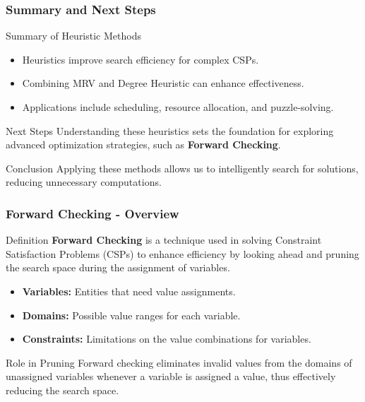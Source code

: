 \documentclass[aspectratio=169]{beamer}
\begin{document}
\begin{frame}[fragile]
    \frametitle{Summary and Next Steps}
    \begin{block}{Summary of Heuristic Methods}
        \begin{itemize}
            \item Heuristics improve search efficiency for complex CSPs.
            \item Combining MRV and Degree Heuristic can enhance effectiveness.
            \item Applications include scheduling, resource allocation, and puzzle-solving.
        \end{itemize}
    \end{block}
    
    \begin{block}{Next Steps}
        Understanding these heuristics sets the foundation for exploring advanced optimization strategies, such as \textbf{Forward Checking}.
    \end{block}
    
    \begin{block}{Conclusion}
        Applying these methods allows us to intelligently search for solutions, reducing unnecessary computations.
    \end{block}
\end{frame}

\begin{frame}[fragile]
    \frametitle{Forward Checking - Overview}
    \begin{block}{Definition}
        \textbf{Forward Checking} is a technique used in solving Constraint Satisfaction Problems (CSPs) to enhance efficiency by looking ahead and pruning the search space during the assignment of variables.
    \end{block}
    
    \begin{itemize}
        \item \textbf{Variables:} Entities that need value assignments.
        \item \textbf{Domains:} Possible value ranges for each variable.
        \item \textbf{Constraints:} Limitations on the value combinations for variables.
    \end{itemize}
    
    \begin{block}{Role in Pruning}
        Forward checking eliminates invalid values from the domains of unassigned variables whenever a variable is assigned a value, thus effectively reducing the search space.
    \end{block}
\end{frame}
\end{document}
